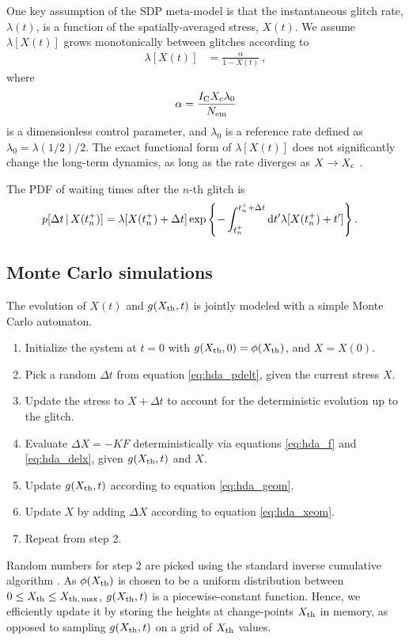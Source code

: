 One key assumption of the SDP meta-model is that the instantaneous glitch rate, $\lambda(t)$, is a function of the spatially-averaged stress, $X(t)$. We assume $\lambda[X(t)]$ grows monotonically between glitches according to
\begin{align}
\lambda[X(t)] &= \frac{\alpha}{1 - X(t)}\ ,
\end{align}
where 
\begin{align}
\alpha = \frac{I_{\rm C} X_\textrm{c} \lambda_0}{N_{\rm em}}
\end{align}
is a dimensionless control parameter, and $\lambda_0$ is a reference rate defined as $\lambda_0 = \lambda(1/2)/2$. The exact functional form of $\lambda[X(t)]$ does not significantly change the long-term dynamics, as long as the rate diverges as $X \rightarrow X_\textrm{c}$ \citep{Fulgenzi2017, Carlin2019quasi}. 

The PDF of waiting times after the $n$-th glitch is \citep{Cox1955, Fulgenzi2017}
\begin{align}
p[\Delta t\,|\,X(t_n^+)] = \lambda&[X(t_n^+) + \Delta t] \exp \left\{-\int_{t_n^+}^{t_n^+ +\Delta t}\textrm{d} t' \lambda[X(t_n^+) + t'] \right\}. \label{eq:hda_pdelt}
\end{align}

\subsection{Monte Carlo simulations} \label{sec:hda_mcsteps}
The evolution of $X(t)$ and $g(X_{\rm th}, t)$ is jointly modeled with a simple Monte Carlo automaton.
\begin{enumerate}[label=\arabic*.]
\item Initialize the system at $t=0$ with $g(X_{\rm th}, 0) = \phi(X_{\rm th})$, and $X = X(0)$.
\item Pick a random $\Delta t$ from equation \eqref{eq:hda_pdelt}, given the current stress $X$.
\item Update the stress to $X + \Delta t$ to account for the deterministic evolution up to the glitch.
\item Evaluate $\Delta X = -KF$ deterministically via equations \eqref{eq:hda_f} and \eqref{eq:hda_delx}, given $g(X_{\rm th}, t)$ and $X$.
\item Update $g(X_{\rm th}, t)$ according to equation \eqref{eq:hda_geom}.
\item Update $X$ by adding $\Delta X$ according to equation \eqref{eq:hda_xeom}.
\item Repeat from step 2.
\end{enumerate}
Random numbers for step 2 are picked using the standard inverse cumulative algorithm \citep{Press2007}. As $\phi(X_{\rm th})$ is chosen to be a uniform distribution between $0\leq X_{\rm th} \leq X_{\rm th,\,max}$, $g(X_{\rm th}, t)$ is a piecewise-constant function. Hence, we efficiently update it by storing the heights at change-points $X_{\rm th}$ in memory, as opposed to sampling $g(X_{\rm th}, t)$ on a grid of $X_{\rm th}$ values. 

